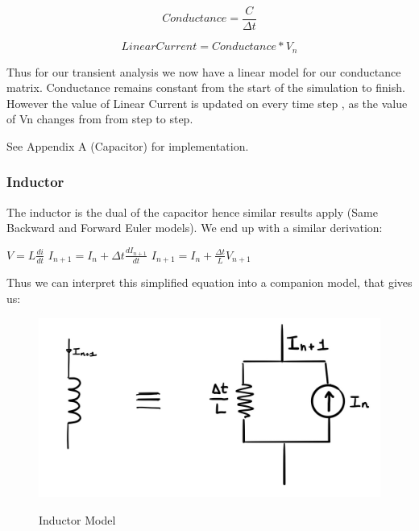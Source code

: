 \documentclass{article}
\begin{document}
\bigbreak

\noindent\begin{minipage}{.4\linewidth}
\begin{equation}
  Conductance = \frac{C}{\Delta t}
\end{equation}
\end{minipage}%
\begin{minipage}{.7\linewidth}
\begin{equation}
  LinearCurrent = Conductance*V_n
\end{equation}
\end{minipage}

\bigbreak 

Thus for our transient analysis we now have a linear model for our conductance matrix. Conductance remains constant from the start of the simulation to finish. However the value of Linear Current is updated on every time step , as the value of Vn changes from from step to step.

\bigbreak 

See Appendix A (Capacitor) for implementation.

\newpage
\subsubsection{Inductor}
The inductor is the dual of the capacitor hence similar results apply (Same Backward and Forward Euler models). We end up with a similar derivation:
\bigbreak

$V = L\frac{di}{dt}$
\medbreak
$I_{n+1} = I_n + \Delta t\frac{dI_{n+1}}{dt}$
\medbreak
$I_{n+1} = I_n + \frac{\Delta t}{L}V_{n+1}$

\bigbreak

Thus we can interpret this simplified equation into a companion model, that gives us: 

\bigbreak

\begin{figure}[h]
    \caption{Inductor Model}
    \centering
    \includegraphics[width=\textwidth]{images/InductorModel.jpg}
    \label{fig:InductorModel}
\end{figure}
\end{document}
